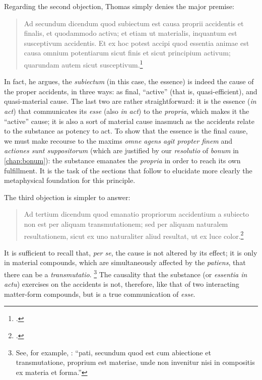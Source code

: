 Regarding the second objection, Thomas simply denies the major premise:
%
\begin{quotation}
Ad secundum dicendum quod subiectum est causa proprii accidentis et finalis, et quodammodo activa; et etiam ut materialis, inquantum est susceptivum accidentis. Et ex hoc potest accipi quod essentia animae est causa omnium potentiarum sicut finis et sicut principium activum; quarundam autem sicut susceptivum.\footcite[I, q.~77, a.~6, ad 2]{st:summa}
\end{quotation}
%
In fact, he argues, the \emph{subiectum} (in this case, the essence) is indeed the cause of the proper accidents, in three ways: as final, “active” (that is, quasi-efficient), and quasi-material cause. The last two are rather straightforward: it is the essence (\emph{in act}) that communicates its \emph{esse} (also \emph{in act}) to the \emph{propria}, which makes it the “active” cause; it is also a sort of material cause inasmuch as the accidents relate to the substance as potency to act. To show that the essence is the final cause, we must make recourse to the maxims \emph{omne agens agit propter finem} and \emph{actiones sunt suppositorum} (which are justified by our \emph{resolutio} of \emph{bonum} in \autoref{chap:bonum}): the substance emanates the \emph{propria} in order to reach its own fulfillment. It is the task of the sections that follow to elucidate more clearly the metaphysical foundation for this principle.

The third objection is simpler to answer: 
%
\begin{quotation}
Ad tertium dicendum quod emanatio propriorum accidentium a subiecto non est per aliquam transmutationem; sed per aliquam naturalem resultationem, sicut ex uno naturaliter aliud resultat, ut ex luce color.\footcite[I, q.~77, a.~6, ad 3]{st:summa}
\end{quotation}
%
It is sufficient to recall that, \emph{per se}, the cause is not altered by its effect; it is only in material compounds, which are simultaneously affected by the \emph{patiens}, that there can be a \emph{transmutatio}.%
%
\footnote{See, for example, \cite[I-II, q.~22, a.~1, ad~1]{st:summa}: “pati, secundum quod est cum abiectione et transmutatione, proprium est materiae, unde non invenitur nisi in compositis ex materia et forma.”} The causality that the substance (or \emph{essentia in actu})  exercises on the accidents is not, therefore, like that of two interacting matter-form compounds, but is a true communication of \emph{esse}.

